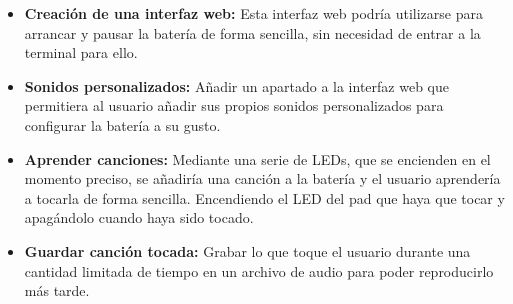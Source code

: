         \begin{itemize}
            \item \textbf{Creación de una interfaz web:} Esta interfaz web podría utilizarse para arrancar y pausar la
            batería de forma sencilla, sin necesidad de entrar a la terminal para ello.
            \item \textbf{Sonidos personalizados:} Añadir un apartado a la interfaz web que permitiera al usuario
            añadir sus propios sonidos personalizados para configurar la batería a su gusto.
            \item \textbf{Aprender canciones:} Mediante una serie de LEDs, que se encienden en el momento preciso, se
            añadiría una canción a la batería y el usuario aprendería a tocarla de forma sencilla. Encendiendo el LED
            del pad que haya que tocar y apagándolo cuando haya sido tocado.
            \item \textbf{Guardar canción tocada:} Grabar lo que toque el usuario durante una cantidad limitada de
            tiempo en un archivo de audio para poder reproducirlo más tarde.
        \end{itemize}
    


\newpage
